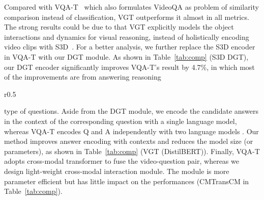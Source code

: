 \documentclass[runningheads]{llncs}
\begin{document}
Compared with VQA-T~\cite{yang2021just} which also formulates VideoQA as problem of similarity comparison instead of classification, VGT outperforms it almost in all metrics. The strong results could be due to that VGT explicitly models the object interactions and dynamics for visual reasoning, instead of holistically encoding video clips with S3D~\cite{miech2020end,xie2018rethinking}. 
For a better analysis, we further replace the S3D encoder in VQA-T with our DGT module. As shown in Table~\ref{tab:comp} (S3D  DGT), our DGT encoder significantly improves VQA-T's result by 4.7\%, in which most of the improvements are from answering reasoning
\setlength{\tabcolsep}{1pt}
\begin{wraptable}[7]{r}{0.5\textwidth}
\vspace{-10pt}
\small
\caption{Detailed comparison with VQA-T \cite{yang2021just}. CMTrans: Cross-Modal Transformer.}\label{tab:comp}
\vspace{4pt}
\end{wraptable}
type of questions.  
Aside from the DGT module, we encode the candidate answers in the context of the corresponding question with a single language model, whereas VQA-T encodes Q and A independently with two language models \cite{sanh2019distilbert}.  
Our method improves answer encoding with contexts and reduces the model size (or parameters), as shown in Table~\ref{tab:comp} (VGT (DistilBERT)).
Finally, VQA-T adopts cross-modal transformer to fuse the video-question pair, whereas we design light-weight cross-modal interaction module. The module is more parameter efficient but has little impact on the performances (CMTransCM in Table~\ref{tab:comp}).
\end{document}
